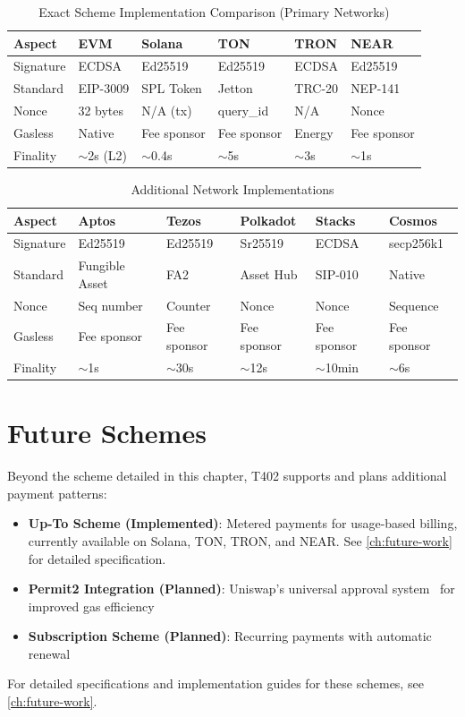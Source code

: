 \begin{table}[htbp]
\centering
\caption{Exact Scheme Implementation Comparison (Primary Networks)}
\label{tab:scheme-comparison}
\footnotesize
\begin{tabular}{llllll}
\toprule
\textbf{Aspect} & \textbf{EVM} & \textbf{Solana} & \textbf{TON} & \textbf{TRON} & \textbf{NEAR} \\
\midrule
Signature & ECDSA & Ed25519 & Ed25519 & ECDSA & Ed25519 \\
Standard & EIP-3009 & SPL Token & Jetton & TRC-20 & NEP-141 \\
Nonce & 32 bytes & N/A (tx) & query\_id & N/A & Nonce \\
Gasless & Native & Fee sponsor & Fee sponsor & Energy & Fee sponsor \\
Finality & $\sim$2s (L2) & $\sim$0.4s & $\sim$5s & $\sim$3s & $\sim$1s \\
\bottomrule
\end{tabular}
\end{table}

\begin{table}[htbp]
\centering
\caption{Additional Network Implementations}
\label{tab:scheme-comparison-additional}
\footnotesize
\begin{tabular}{llllll}
\toprule
\textbf{Aspect} & \textbf{Aptos} & \textbf{Tezos} & \textbf{Polkadot} & \textbf{Stacks} & \textbf{Cosmos} \\
\midrule
Signature & Ed25519 & Ed25519 & Sr25519 & ECDSA & secp256k1 \\
Standard & Fungible Asset & FA2 & Asset Hub & SIP-010 & Native \\
Nonce & Seq number & Counter & Nonce & Nonce & Sequence \\
Gasless & Fee sponsor & Fee sponsor & Fee sponsor & Fee sponsor & Fee sponsor \\
Finality & $\sim$1s & $\sim$30s & $\sim$12s & $\sim$10min & $\sim$6s \\
\bottomrule
\end{tabular}
\end{table}

\section{Future Schemes}
\label{sec:future-schemes}

Beyond the  scheme detailed in this chapter, T402 supports and plans additional payment patterns:

\begin{itemize}
    \item \textbf{Up-To Scheme (Implemented)}: Metered payments for usage-based billing, currently available on Solana, TON, TRON, and NEAR. See \cref{ch:future-work} for detailed specification.
    \item \textbf{Permit2 Integration (Planned)}: Uniswap's universal approval system~\cite{permit2} for improved gas efficiency
    \item \textbf{Subscription Scheme (Planned)}: Recurring payments with automatic renewal
\end{itemize}

For detailed specifications and implementation guides for these schemes, see \cref{ch:future-work}.
